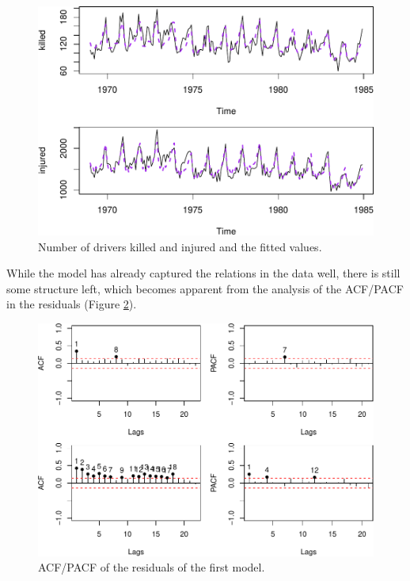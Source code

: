 \documentclass[
]{book}
\begin{document}
\begin{figure}
\centering
\includegraphics{Svetunkov---Svetunkov---Complex-Valued-Econometrics_files/figure-latex/seatbeltsDataModel1-1.pdf}
\caption{\label{fig:seatbeltsDataModel1}Number of drivers killed and injured and the fitted values.}
\end{figure}

While the model has already captured the relations in the data well, there is still some structure left, which becomes apparent from the analysis of the ACF/PACF in the residuals (Figure \ref{fig:seatbeltsDataModel1ACF}).

\begin{figure}
\centering
\includegraphics{Svetunkov---Svetunkov---Complex-Valued-Econometrics_files/figure-latex/seatbeltsDataModel1ACF-1.pdf}
\caption{\label{fig:seatbeltsDataModel1ACF}ACF/PACF of the residuals of the first model.}
\end{figure}
\end{document}
